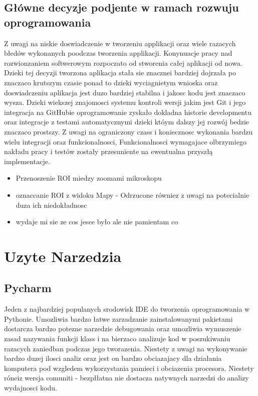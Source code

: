 \documentclass[11pt,a4paper]{article}
\begin{document}
    \subsection{Główne decyzje podjente w ramach rozwuju oprogramowania}
    \hspace{1cm} Z uwagi na niskie doswiadczenie w tworzeniu applikacji oraz wiele razacych błedów wykonanych poodczas tworzenia applikacji. Konynuacje pracy nad rozwionzaniem softwerowym rozpoczato od stworenia całej aplikacji od nowa. Dzieki tej decyzji tworzona aplikacja stała sie znacznei bardziej dojrzała po znaczaco krutszym czasie ponad to dzieki wyciagnietym wnioska oraz doswiadczeniu aplikacja jest duzo bardziej stabilna i jakosc kodu jest znaczaco wysza. Dzieki wiekszej znajomosci systemu kontroli wersji jakim jest Git i jego integracja na GitHubie oprogramowanie zyskało dokladna historie developmentu oraz integracje z testami automatycznymi dzieki któym dalszy jej rozwój bedzie znaczaco prostszy.
    \hspace{1cm} Z uwagi na ograniczony czass i koniecznosc wykonania bardzu wielu integracji oraz funkcionalnosci, Funkcionalnosci wymagajace olbrzymiego nakładu pracy i testów zostały przesuniente na ewentualna przyszłą implementacje.
    \begin{itemize}
        \item Przenoszenie ROI miedzy zoomami mikroskopu
        \item oznaccanie ROI z widoku Mapy - Odrzucone równiez z uwagi na potecialnie duza ich niedokładnosc
        \item wydaje mi sie ze cos jesce było ale nie pamientam co
    \end{itemize}

    \section{Uzyte Narzedzia}

    \subsection{Pycharm}
        \hspace{1cm} Jeden z najbardziej populanych srodowisk IDE do tworzenia oprogramowania w Pythonie. Umozliwia bardzo łatwe zarzadzanie zainstalowanymi pakietami dostarcza bardzo potezne narzedzie debugowania oraz umozliwia wymuszenie zasad nazywania funkcji klass i na bierzaco analizuje kod w poszukiwaniu razacych zaniedban podczas jego tworazenia. Niestety z uwagi na wykonywanie bardzo duzej ilosci analiz oraz jest on bardzo obciazajacy dla działania komputera pod wzgledem wykorzystania pamieci i obciazenia procesora. Niestety róneiz wersja comuniti - bezpłłatna nie dostacza natywnych narzedzi do analizy wydajnosci kodu.
\end{document}
